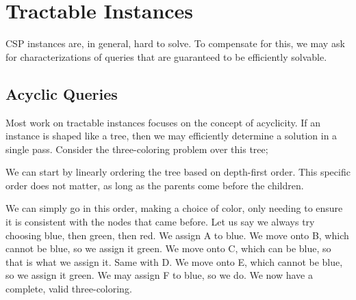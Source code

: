 \section{Tractable Instances}\label{sec:tractable-queries}
CSP instances are, in general, hard to solve. To compensate for this, we may ask for characterizations of queries that are guaranteed to be efficiently solvable.

\subsection{Acyclic Queries}\label{sec:acyclic-queries}

Most work on tractable instances focuses on the concept of acyclicity. If an instance is shaped like a tree, then we may efficiently determine a solution in a single pass. Consider the three-coloring problem over this tree;

\begin{center}
\end{center}

We can start by linearly ordering the tree based on depth-first order. This specific order does not matter, as long as the parents come before the children.

\begin{center}
\end{center}

We can simply go in this order, making a choice of color, only needing to ensure it is consistent with the nodes that came before. Let us say we always try choosing blue, then green, then red. We assign A to blue. We move onto B, which cannot be blue, so we assign it green. We move onto C, which can be blue, so that is what we assign it. Same with D. We move onto E, which cannot be blue, so we assign it green. We may assign F to blue, so we do. We now have a complete, valid three-coloring.

